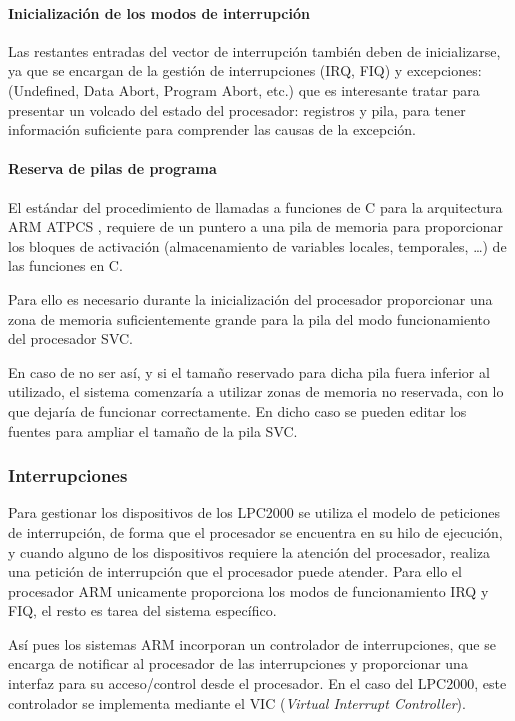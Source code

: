 \documentclass[10pt,a4paper]{article}
\begin{document}
	\paragraph{Inicialización de los modos de interrupción}
	
	Las restantes entradas del vector de interrupción también deben de inicializarse, ya que se encargan de la gestión de interrupciones (IRQ, FIQ) y excepciones: (Undefined, Data Abort, Program Abort, etc.) que es interesante tratar para presentar un volcado del estado del procesador: registros y pila, para tener información suficiente para comprender las causas de la excepción.

	\paragraph{Reserva de pilas de programa}
	
	El estándar del procedimiento de llamadas a funciones de C para la arquitectura ARM ATPCS \cite{ATCPS}, requiere de un puntero a una pila de memoria para proporcionar los bloques de activación (almacenamiento de variables locales, temporales, \ldots) de las funciones en C.
	
	Para ello es necesario durante la inicialización del procesador proporcionar una zona de memoria suficientemente grande para la pila del modo funcionamiento del procesador SVC.
	
	En caso de no ser así, y si el tamaño reservado para dicha pila fuera inferior al utilizado, el sistema comenzaría a utilizar zonas de memoria no reservada, con lo que dejaría de funcionar correctamente. En dicho caso se pueden editar los fuentes para ampliar el tamaño de la pila SVC.
	
	\subsubsection{Interrupciones}
	
	Para gestionar los dispositivos de los LPC2000 se utiliza el modelo de peticiones de interrupción, de forma que el procesador se encuentra en su hilo de ejecución, y cuando alguno de los dispositivos requiere la atención del procesador, realiza una petición de interrupción que el procesador puede atender. Para ello el procesador ARM unicamente proporciona los modos de funcionamiento IRQ y FIQ, el resto es tarea del sistema específico.

	Así pues los sistemas ARM incorporan un controlador de interrupciones, que se encarga de notificar al procesador de las interrupciones y proporcionar una interfaz para su acceso/control desde el procesador. En el caso del LPC2000, este controlador se implementa mediante el VIC (\emph{Virtual Interrupt Controller}).
	
\end{document}
